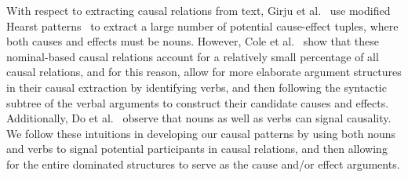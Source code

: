 




With respect to extracting causal relations from text, Girju et al.~\citeyear{girju2002text} use modified Hearst patterns~\cite{hearst1992automatic} to extract a large number of potential cause-effect tuples, where both causes and effects must be nouns.
However, Cole et al.~\citeyear{cole2005lightweight} show that these nominal-based causal relations account for a relatively small percentage of all causal relations, and for this reason, \cite{yang2014multi} allow for more elaborate argument structures in their causal extraction by identifying verbs, and then following the syntactic subtree of the verbal arguments to construct their candidate causes and effects. 
Additionally, Do et al.~\citeyear{do2011minimally} observe that nouns as well as verbs can signal causality.  
We follow these intuitions in developing our causal patterns by using both nouns and verbs to signal potential participants in causal relations, and then allowing for the entire dominated structures to serve as the cause and/or effect arguments.




